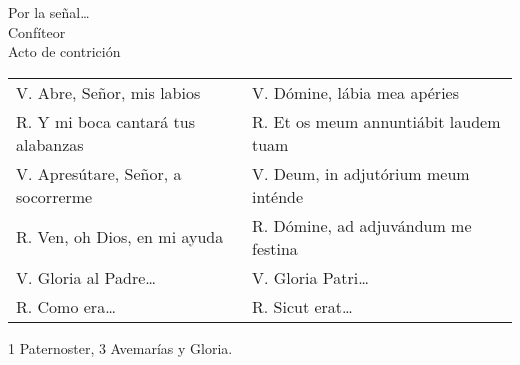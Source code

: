 \documentclass[./devocionario.tex]{subfiles}
\begin{document}
    \begin{center}
        Por la señal{\ldots}\\
        Confíteor\\
        Acto de contrición
    \end{center}

    \begin{longtable} {p{} p{} }
        V. Abre, Señor, mis labios & V. Dómine, lábia mea apéries\\
        R. Y mi boca cantará tus alabanzas & R. Et os meum annuntiábit laudem tuam\\
        V. Apresútare, Señor, a socorrerme & V. Deum, in adjutórium meum inténde\\
        R. Ven, oh Dios, en mi ayuda & R. Dómine, ad adjuvándum me festina\\ 
        V. Gloria al Padre{\ldots} & V. Gloria Patri{\ldots}\\
        R. Como era{\ldots} & R. Sicut erat{\ldots}\\
    \end{longtable}

    

    \begin{center}
        1 Paternoster, 3 Avemarías y Gloria.
    \end{center}
\end{document}
